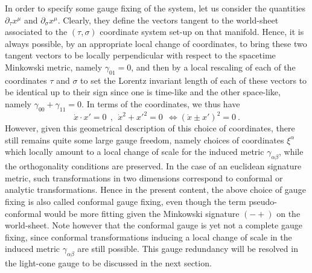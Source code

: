 \documentclass[a4paper,11pt]{article}
\begin{document}
In order to specify some gauge fixing of the system, let us consider
the quantities $\partial_\tau x^\mu$ and $\partial_\sigma x^\mu$.
Clearly, they define the vectors tangent to the world-sheet associated
to the $(\tau,\sigma)$ coordinate system set-up on that manifold.
Hence, it is always possible, by an appropriate local change of coordinates,
to bring these two tangent vectors to be locally perpendicular
with respect to the spacetime Minkowski metric, namely $\gamma_{01}=0$,
and then by a local rescaling of each of the coordinates $\tau$ and $\sigma$
to set the Lorentz invariant length of each of these vectors to be identical 
up to their sign since one is time-like and the other space-like, namely
$\gamma_{00}+\gamma_{11}=0$. In terms of the coordinates, we thus have
\begin{equation}
\dot{x}\cdot x'=0\ \ ,\ \ \dot{x}^2+{x'}^2=0\ \ 
\Longleftrightarrow \left(\dot{x}\pm{x}'\right)^2=0\ .
\label{eq:conformalgaugefixing}
\end{equation}
However, given this geometrical description of this choice of coordinates,
there still remains quite some large gauge freedom, namely choices of
coordinates $\xi^\alpha$ which locally amount to a local change of scale
for the induced metric $\gamma_{\alpha\beta}$,
while the orthogonality conditions are preserved. In the case of an
euclidean signature metric, such transformations in two dimensions
correspond to conformal or analytic transformations. Hence in the
present content, the above choice of gauge fixing is also called conformal 
gauge fixing, even though the term pseudo-conformal would be more fitting
given the Minkowski si\-gna\-tu\-re $(-+)$ on the world-sheet. Note however
that the conformal gauge is yet not a complete gauge fixing, since conformal
transformations inducing a local change of scale in the induced metric
$\gamma_{\alpha\beta}$ are still possible. This gauge redundancy will
be resolved in the light-cone gauge to be discussed in the next section.
\end{document}
